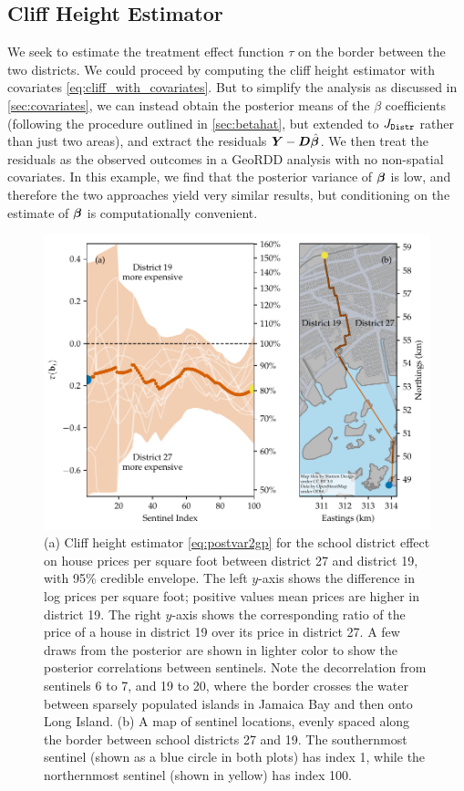 \subsection{Cliff Height Estimator}

We seek to estimate the treatment effect function \(\tau\) on the border between the two districts.
We could proceed by computing the cliff height estimator with covariates \autoref{eq:cliff_with_covariates}.
But to simplify the analysis as discussed in \autoref{sec:covariates}, we can instead obtain the posterior means of the \(\beta\) coefficients (following the procedure outlined in \autoref{sec:betahat}, but extended to \(J_{\mathtt{Distr}}\) rather than just two areas), and extract the residuals \(\bm{Y}{}-\bm{D} \hat{\bm{\beta}}\).
We then treat the residuals as the observed outcomes in a GeoRDD analysis with no non-spatial covariates.
In this example, we find that the posterior variance of \(\bm{\beta}\) is low, and therefore the two approaches yield very similar results, but conditioning on the estimate of \(\bm{\beta}\) is computationally convenient.

\begin{figure}[tb]
    \centering
    \includegraphics[height=0.35\textheight]{figures/NYC_cliff_face.pdf}
    \caption{\label{fig:NYC_cliff_height}
        (a)
        Cliff height estimator \autoref{eq:postvar2gp} for the school district effect on house prices per square foot between district 27 and district 19, with 95\% credible envelope.
        The left \(y\)-axis shows the difference in log prices per square foot; positive values mean prices are higher in district 19.
        The right \(y\)-axis shows the corresponding ratio of the price of a house in district 19 over its price in district 27.
        A few draws from the posterior are shown in lighter color to show the posterior correlations between sentinels.
        Note the decorrelation from sentinels 6 to 7, and 19 to 20, where the border crosses the water between sparsely populated islands in Jamaica Bay and then onto Long Island.
        (b)
        A map of sentinel locations, evenly spaced along the border between school districts 27 and 19.
    	The southernmost sentinel (shown as a blue circle in both plots) has index 1, while the northernmost sentinel (shown in yellow) has index 100.
	}
\end{figure}

